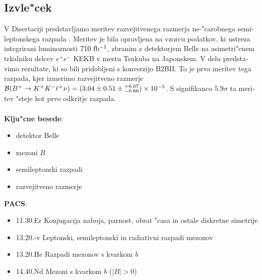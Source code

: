 \begin{otherlanguage}{slovene}
\chapter*{Izvle"cek}
V Disertaciji predstavljamo meritev razvejitvenega razmerja ne-"carobnega semileptonskega razpada \decayb. Meritev je bila opravljena na vzorcu podatkov, ki ustreza integrirani luminoznosti $710\mathrm{~fb^{-1}}$, zbranim z detektorjem Belle na asimetri"cnem trkalniku delcev $e^+e^-$ KEKB v mestu Tsukuba na Japonskem. V delu predstavimo rezultate, ki so bili pridobljeni s konverzijo B2BII. To je prva meritev tega razpada, kjer izmerimo razvejitveno razmerje $\mathcal{B}(B^+ \to K^+ K^- \ell^+ \nu) = (3.04 \pm 0.51 \pm {}^{+0.67}_{-0.66})\times 10^{-5}$. S signifikanco $5.9\sigma$ ta meritev "steje kot prvo odkritje razpada.\\
\vspace{1cm}\\
{{\bf Klju"cne besede}:}
\begin{itemize}
	\item detektor Belle
	\item mezoni $B$
	\item semileptonski razpadi
	\item razvejitveno razmerje
\end{itemize}
\vspace{1cm}
{{\bf PACS}:}
\begin{itemize}
	\item 11.30.Er Konjugacija naboja, parnost, obrat "casa in ostale diskretne simetrije
	\item 13.20.-v Leptonski, semileptonski in radiativni razpadi mezonov
	\item 13.20.He Razpadi mezonov s kvarkom $b$
	\item 14.40.Nd Mezoni s kvarkom $b$ ($|B|>0$) 
\end{itemize}
\end{otherlanguage}

\pagestyle{empty}

\cleardoublepage
\pagestyle{plain}
